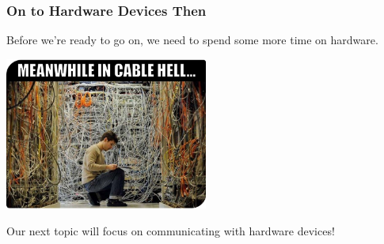 \begin{frame}
\frametitle{On to Hardware Devices Then}

Before we're ready to go on, we need to spend some more time on hardware.

\begin{center}
	\includegraphics[width=0.5\textwidth]{images/cable_hell.jpg}
\end{center}

Our next topic will focus on communicating with hardware devices!

\end{frame}



